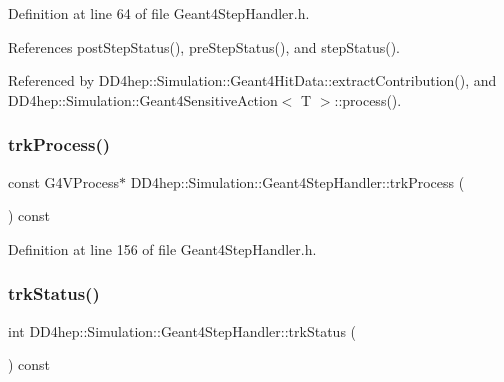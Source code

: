 Definition at line 64 of file Geant4\+Step\+Handler.\+h.



References post\+Step\+Status(), pre\+Step\+Status(), and step\+Status().



Referenced by D\+D4hep\+::\+Simulation\+::\+Geant4\+Hit\+Data\+::extract\+Contribution(), and D\+D4hep\+::\+Simulation\+::\+Geant4\+Sensitive\+Action$<$ T $>$\+::process().

\hypertarget{class_d_d4hep_1_1_simulation_1_1_geant4_step_handler_acffd1bd0147db2b8b82802a21ce11e35}{}\label{class_d_d4hep_1_1_simulation_1_1_geant4_step_handler_acffd1bd0147db2b8b82802a21ce11e35} 
\subsubsection{\texorpdfstring{trk\+Process()}{trkProcess()}}
{\footnotesize\ttfamily const G4\+V\+Process$\ast$ D\+D4hep\+::\+Simulation\+::\+Geant4\+Step\+Handler\+::trk\+Process (\begin{DoxyParamCaption}{ }\end{DoxyParamCaption}) const\hspace{0.3cm}{\ttfamily [inline]}}



Definition at line 156 of file Geant4\+Step\+Handler.\+h.

\hypertarget{class_d_d4hep_1_1_simulation_1_1_geant4_step_handler_ab1a42f1b82a5b21c01681c6c4c3a61fa}{}\label{class_d_d4hep_1_1_simulation_1_1_geant4_step_handler_ab1a42f1b82a5b21c01681c6c4c3a61fa} 
\subsubsection{\texorpdfstring{trk\+Status()}{trkStatus()}}
{\footnotesize\ttfamily int D\+D4hep\+::\+Simulation\+::\+Geant4\+Step\+Handler\+::trk\+Status (\begin{DoxyParamCaption}{ }\end{DoxyParamCaption}) const\hspace{0.3cm}{\ttfamily [inline]}}



